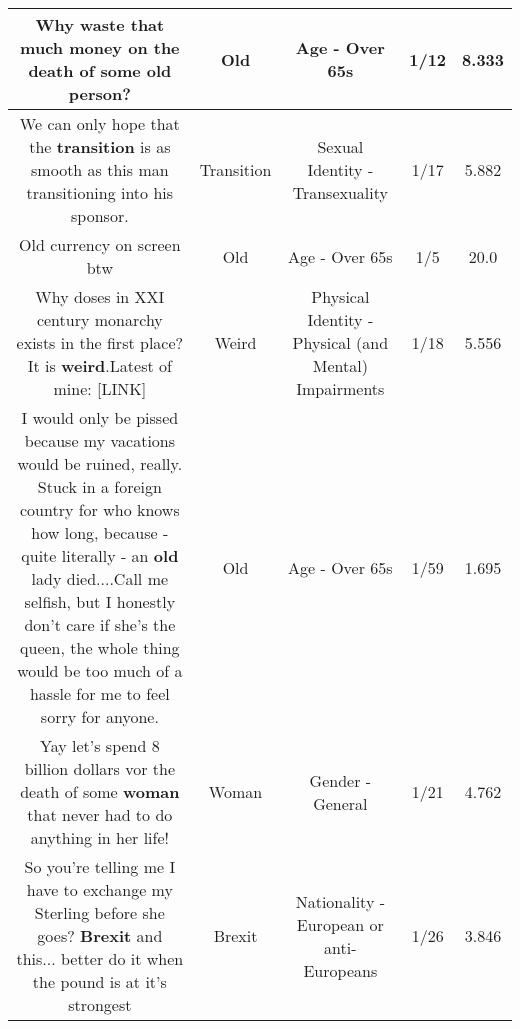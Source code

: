 \documentclass[11pt]{article}
\newlength\mylength
\begin{document}
\begin{center}
\begin{longtable}{|C{.65\mylength}|C{.30\mylength}|C{.12\mylength}|C{.12\mylength}|C{.12\mylength}|}
  \small Why waste that much money on the death of some \textbf{old} person?\normalsize   & Old & Age - Over 65s & 1/12 & 8.333 \\  \hline
  \small We can only hope that the \textbf{transition} is as smooth as this man transitioning into his sponsor.\normalsize   & Transition & Sexual Identity - Transexuality & 1/17 & 5.882 \\  \hline
  \small Old currency on screen btw\normalsize   & Old & Age - Over 65s & 1/5 & 20.0 \\  \hline
  \small Why doses in XXI century monarchy exists in the first place? It is \textbf{weird}.Latest of mine:  [LINK] \normalsize   & Weird & Physical Identity - Physical (and Mental) Impairments & 1/18 & 5.556 \\  \hline
  \small I would only be pissed because my vacations would be ruined, really. Stuck in a foreign country for who knows how long, because - quite literally - an \textbf{old} lady died....Call me selfish, but I honestly don't care if she's the queen, the whole thing would be too much of a hassle for me to feel sorry for anyone.\normalsize   & Old & Age - Over 65s & 1/59 & 1.695 \\  \hline
  \small Yay let's spend 8 billion dollars vor the death of some \textbf{woman} that never had to do anything in her life!\normalsize   & Woman & Gender - General & 1/21 & 4.762 \\  \hline
  \small So you're telling me I have to exchange my Sterling before she goes? \textbf{Brexit} and this... better do it when the pound is at it's strongest\normalsize   & Brexit & Nationality - European or anti-Europeans & 1/26 & 3.846 \\  \hline

\end{longtable}
\end{center}
\end{document}
